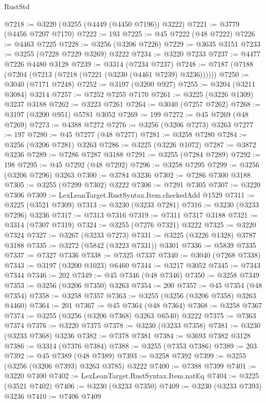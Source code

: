 \begin{lexlean}{RustStd}
\begin{coremodule}
{\begin{coremodule}
{{{{{{{{{{{{{{{{{{{{{{{{{{{{{{{{{{{{{@7218 := @3220 (@3255 (@4449 (@4450 @7196)) @3222)
@7221 := @3779 (@4456 @7207 @7170)
@7222 := 193
@7225 := @45 @7222 (@48 @7222)
@7226 := @4463 @7225
@7228 := @3256 (@3206 @7226)
@7229 := @3635 @3151
@7233 := @3255 (@7228 @7229 @3269) @3222
@7234 := @3220 @7233
@7237 := @4477 @7226 @4480 @3128
@7239 := @3314 (@7234 @7237)
@7248 := @7187 (@7188 (@7204 (@7213 (@7218 (@7221 (@3230 (@4461 @7239) @3236))))))
@7250 := @3040 (@7171 @7248)
@7252 := @3197 (@3200 @927)
@7255 := @3204 (@3211 @3084) @3214
@7257 := @7252 @7255 @7170
@7261 := @3225 (@3226 @1309) @3237 @3188
@7262 := @3223 @7261
@7264 := @3040 (@7257 @7262)
@7268 := @3197 (@3200 @951) @5781 @3052
@7269 := 199
@7272 := @45 @7269 (@48 @7269)
@7273 := @4388 @7272
@7276 := @3256 (@3206 @7273) @3263
@7277 := 197
@7280 := @45 @7277 (@48 @7277)
@7281 := @3258 @7280
@7284 := @3256 (@3206 @7281) @3263
@7286 := @3225 (@3226 @1072)
@7287 := @3872 @3236
@7289 := @7286 @7287 @3188
@7291 := @3255 (@7284 @7289)
@7292 := 198
@7295 := @45 @7292 (@48 @7292)
@7296 := @3258 @7295
@7299 := @3256 (@3206 @7296) @3263
@7300 := @3784 @3236
@7302 := @7286 @7300 @3188
@7305 := @3255 (@7299 @7302) @3222
@7306 := @7291 @7305
@7307 := @3220 @7306
@7309 := LexLeanTarget.RustSyntax.Item.checkedAdd @1529
@7311 := @3225 (@3521 @7309)
@7313 := @3230 (@3233 @7281)
@7316 := @3230 (@3233 @7296) @3236
@7317 := @7313 @7316
@7319 := @7311 @7317 @3188
@7321 := @3314 (@7307 @7319)
@7324 := @3255 (@7276 @7321) @3222
@7325 := @3220 @7324
@7327 := @3267 (@3233 @7273)
@7331 := @3225 (@3226 @1328) @3787 @3188
@7335 := @3272 (@5842 (@3223 @7331)) @3301
@7336 := @5839 @7335
@7337 := @7327 @7336
@7338 := @7325 @7337
@7340 := @3040 (@7268 @7338)
@7343 := @3197 (@3200 @1023) @6460
@7344 := @3217 @3052
@7345 := @7343 @7344
@7346 := 202
@7349 := @45 @7346 (@48 @7346)
@7350 := @3258 @7349
@7353 := @3256 (@3206 @7350) @3263
@7354 := 200
@7357 := @45 @7354 (@48 @7354)
@7358 := @3258 @7357
@7363 := @3255 (@3256 (@3206 @7358) @3263 @4460)
@7364 := 201
@7367 := @45 @7364 (@48 @7364)
@7368 := @3258 @7367
@7374 := @3255 (@3256 (@3206 @7368) @3263 @6540) @3222
@7375 := @7363 @7374
@7376 := @3220 @7375
@7378 := @3230 (@3233 @7358)
@7381 := @3230 (@3233 @7368) @3236
@7382 := @7378 @7381
@7384 := @3693 @7382 @3128
@7386 := @3314 (@7376 @7384)
@7388 := @3255 (@7353 @7386)
@7389 := 203
@7392 := @45 @7389 (@48 @7389)
@7393 := @3258 @7392
@7399 := @3255 (@3256 (@3206 @7393) @3263 @3785) @3222
@7400 := @7388 @7399
@7401 := @3220 @7400
@7402 := LexLeanTarget.RustSyntax.Item.natEq
@7404 := @3225 (@3521 @7402)
@7406 := @3230 (@3233 @7350)
@7409 := @3230 (@3233 @7393) @3236
@7410 := @7406 @7409
}}}}}}}}}}}}}}}}}}}}}}}}}}}}}}}}}}}}}
\end{coremodule}}
\end{coremodule}
\end{lexlean}
